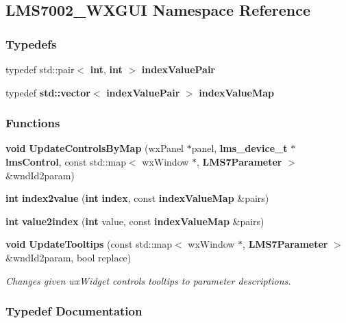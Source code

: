 \subsection{L\+M\+S7002\+\_\+\+W\+X\+G\+UI Namespace Reference}
\label{namespaceLMS7002__WXGUI}
\subsubsection*{Typedefs}
\begin{DoxyCompactItemize}
\item 
typedef std\+::pair$<$ {\bf int}, {\bf int} $>$ {\bf index\+Value\+Pair}
\item 
typedef {\bf std\+::vector}$<$ {\bf index\+Value\+Pair} $>$ {\bf index\+Value\+Map}
\end{DoxyCompactItemize}
\subsubsection*{Functions}
\begin{DoxyCompactItemize}
\item 
{\bf void} {\bf Update\+Controls\+By\+Map} (wx\+Panel $\ast$panel, {\bf lms\+\_\+device\+\_\+t} $\ast${\bf lms\+Control}, const std\+::map$<$ wx\+Window $\ast$, {\bf L\+M\+S7\+Parameter} $>$ \&wnd\+Id2param)
\item 
{\bf int} {\bf index2value} ({\bf int} {\bf index}, const {\bf index\+Value\+Map} \&pairs)
\item 
{\bf int} {\bf value2index} ({\bf int} value, const {\bf index\+Value\+Map} \&pairs)
\item 
{\bf void} {\bf Update\+Tooltips} (const std\+::map$<$ wx\+Window $\ast$, {\bf L\+M\+S7\+Parameter} $>$ \&wnd\+Id2param, bool replace)
\begin{DoxyCompactList}\small\item\em Changes given wx\+Widget controls tooltips to parameter descriptions. \end{DoxyCompactList}\end{DoxyCompactItemize}


\subsubsection{Typedef Documentation}

